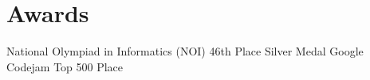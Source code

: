 \documentclass[10pt,a4paper,roman]{moderncv} %
\begin{document}

\section{Awards}
        {National Olympiad in Informatics (NOI)}
        {46th Place}
        {Silver Medal}
        {}{}
        {Google Codejam}
        {Top 500 Place}
        {}{}{}
\end{document}
